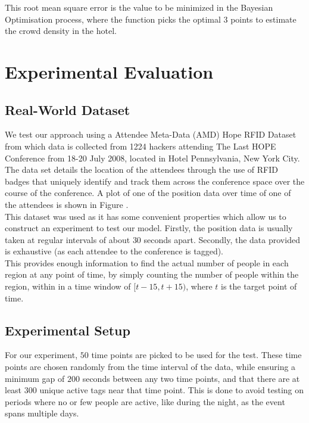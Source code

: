 \documentclass[letterpaper]{article}
\begin{document}
This root mean square error is the value to be minimized in the Bayesian Optimisation process, where the function picks the optimal 3 points to estimate the crowd density in the hotel.

\section{Experimental Evaluation}

\subsection{Real-World Dataset}

We test our approach using a Attendee Meta-Data (AMD) Hope RFID Dataset from which data is collected from 1224 hackers attending The Last HOPE Conference from 18-20 July 2008, located in Hotel Pennsylvania, New York City.\\

The data set details the location of the attendees through the use of RFID badges that uniquely identify and track them across the conference space over the course of the conference. A plot of one of the position data over time of one of the attendees is shown in Figure .\\

This dataset was used as it has some convenient properties which allow us to construct an experiment to test our model. Firstly, the position data is usually taken at regular intervals of about $30$ seconds apart. Secondly, the data provided is exhaustive (as each attendee to the conference is tagged). \\

This provides enough information to find the actual number of people in each region at any point of time, by simply counting the number of people within the region, within in a time window of $[t-15,t+15)$, where $t$ is the target point of time.

\subsection{Experimental Setup}

For our experiment, $50$ time points are picked to be used for the test. These time points are chosen randomly from the time interval of the data, while ensuring a minimum gap of $200$ seconds between any two time points, and that there are at least $300$ unique active tags near that time point. This is done to avoid testing on periods where no or few people are active, like during the night, as the event spans multiple days.\\
\end{document}

